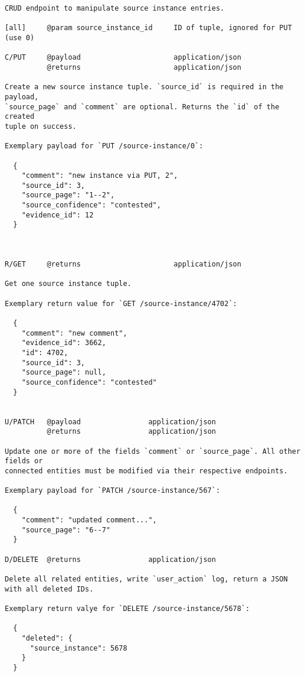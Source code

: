{\small\begin{verbatim}CRUD endpoint to manipulate source instance entries.

[all]     @param source_instance_id     ID of tuple, ignored for PUT (use 0)

C/PUT     @payload                      application/json
          @returns                      application/json

Create a new source instance tuple. `source_id` is required in the payload,
`source_page` and `comment` are optional. Returns the `id` of the created
tuple on success.

Exemplary payload for `PUT /source-instance/0`:

  {
    "comment": "new instance via PUT, 2",
    "source_id": 3,
    "source_page": "1--2",
    "source_confidence": "contested",
    "evidence_id": 12
  }



R/GET     @returns                      application/json

Get one source instance tuple.

Exemplary return value for `GET /source-instance/4702`:

  {
    "comment": "new comment",
    "evidence_id": 3662,
    "id": 4702,
    "source_id": 3,
    "source_page": null,
    "source_confidence": "contested"
  }


U/PATCH   @payload                application/json
          @returns                application/json

Update one or more of the fields `comment` or `source_page`. All other fields or
connected entities must be modified via their respective endpoints.

Exemplary payload for `PATCH /source-instance/567`:

  {
    "comment": "updated comment...",
    "source_page": "6--7"
  }

D/DELETE  @returns                application/json

Delete all related entities, write `user_action` log, return a JSON with all deleted IDs.

Exemplary return valye for `DELETE /source-instance/5678`:

  {
    "deleted": {
      "source_instance": 5678
    }
  }

\end{verbatim}}
